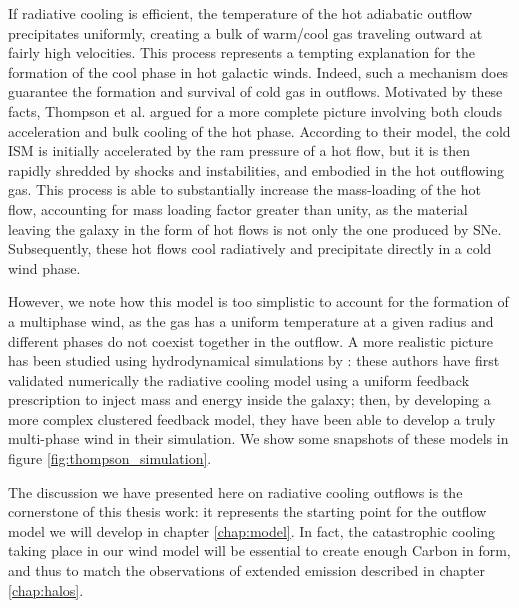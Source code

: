 If radiative cooling is efficient, the temperature of the hot adiabatic outflow precipitates uniformly, creating a bulk of warm/cool gas traveling outward at fairly high velocities. This process represents a tempting explanation for the formation of the cool phase in hot galactic winds. Indeed, such a mechanism does guarantee the formation and survival of cold gas in outflows. Motivated by these facts, Thompson et al. \citep{Thompson16} argued for a more complete picture involving both clouds acceleration and bulk cooling of the hot phase. According to their model, the cold ISM is initially accelerated by the ram pressure of a hot flow, but it is then rapidly shredded by shocks and instabilities, and embodied in the hot outflowing gas. This process is able to substantially increase the mass-loading of the hot flow, accounting for mass loading factor greater than unity, as the material leaving the galaxy in the form of hot flows is not only the one produced by SNe. Subsequently, these hot flows cool radiatively and precipitate directly in a cold wind phase. 

However, we note how this model is too simplistic to account for the formation of a multiphase wind, as the gas has a uniform temperature at a given radius and different phases do not coexist together in the outflow. A more realistic picture has been studied using hydrodynamical simulations by \citet{schneider2018production}: these authors have first validated numerically the radiative cooling model using a uniform feedback prescription to inject mass and energy inside the galaxy; then, by developing a more complex clustered feedback model, they have been able to develop a truly multi-phase wind in their simulation. We show some snapshots of these models in figure \ref{fig:thompson_simulation}.

The discussion we have presented here on radiative cooling outflows is the cornerstone of this thesis work: it represents the starting point for the outflow model we will develop in chapter \ref{chap:model}. In fact, the catastrophic cooling taking place in our wind model will be essential to create enough Carbon in \CIIion form, and thus to match the observations of extended \CII emission described in chapter \ref{chap:halos}.



